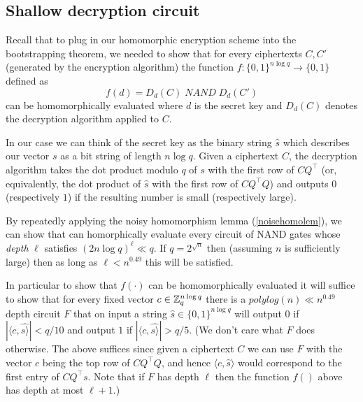 \subsection{Shallow decryption circuit}\label{17-Shallow-decryption-cir}

Recall that to plug in our homomorphic encryption scheme into the
bootstrapping theorem, we needed to show that for every ciphertexts
\(C,C'\) (generated by the encryption algorithm) the function
\(f:\{0,1\}^{n \log q} \rightarrow \{0,1\}\) defined as
\begin{equation*}
f(d) = D_d(C) \;\ensuremath{\mathit{NAND}}\; D_d(C')
\end{equation*}
can be homomorphically evaluated where \(d\) is the secret key and
\(D_d(C)\) denotes the decryption algorithm applied to \(C\).

In our case we can think of the secret key as the binary string
\(\hat{s}\) which describes our vector \(s\) as a bit string of length
\(n\log q\). Given a ciphertext \(C\), the decryption algorithm takes
the dot product modulo \(q\) of \(s\) with the first row of
\(\ensuremath{\mathit{CQ}}^\top\) (or, equivalently, the dot product of
\(\hat{s}\) with the first row of \(\ensuremath{\mathit{CQ}}^\top Q\))
and outputs \(0\) (respectively \(1\)) if the resulting number is small
(respectively large).

By repeatedly applying the noisy homomorphism lemma
(\cref{noisehomolem}), we can show that can homorphically evaluate every
circuit of NAND gates whose \emph{depth} \(\ell\) satisfies
\((2n\log q)^\ell \ll q\). If \(q = 2^{\sqrt{n}}\) then (assuming \(n\)
is sufficiently large) then as long as \(\ell < n^{0.49}\) this will be
satisfied.

In particular to show that \(f(\cdot)\) can be homomorphically evaluated
it will suffice to show that for every fixed vector
\(c\in {\mathbb{Z}}_q^{n\log q}\) there is a \(polylog(n) \ll n^{0.49}\) depth
circuit \(F\) that on input a string \(\hat{s}\in\{0,1\}^{n \log q}\)
will output \(0\) if \(|\langle c,\hat{s \rangle}| < q/10\) and output
\(1\) if \(|\langle c,\hat{s \rangle}| > q/5\). (We don't care what
\(F\) does otherwise. The above suffices since given a ciphertext \(C\)
we can use \(F\) with the vector \(c\) being the top row of
\(\ensuremath{\mathit{CQ}}^\top Q\), and hence
\(\langle c,\hat{s} \rangle\) would correspond to the first entry of
\(\ensuremath{\mathit{CQ}}^\top s\). Note that if \(F\) has depth
\(\ell\) then the function \(f()\) above has depth at most \(\ell+1\).)

